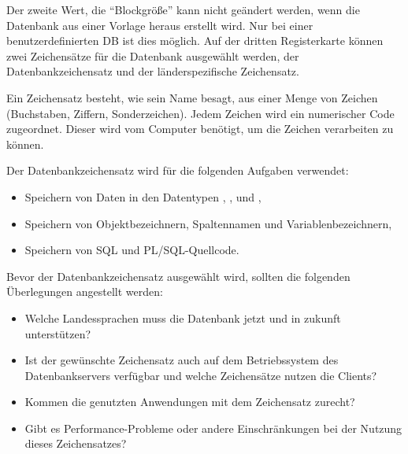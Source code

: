           Der zweite Wert, die \enquote{Blockgröße} kann nicht geändert
          werden, wenn die Datenbank aus einer Vorlage heraus erstellt wird. Nur
          bei einer benutzerdefinierten DB ist dies möglich.
          Auf der dritten Registerkarte können zwei Zeichensätze für die
          Datenbank ausgewählt werden, der Datenbankzeichensatz und der
          länderspezifische Zeichensatz.
          \begin{merke}
            Ein Zeichensatz besteht, wie sein Name besagt, aus einer Menge von Zeichen (Buchstaben,               Ziffern, Sonderzeichen). Jedem Zeichen wird ein numerischer Code zugeordnet. Dieser wird vom Computer benötigt, um die Zeichen verarbeiten zu können.
          \end{merke}
          Der Datenbankzeichensatz wird für die folgenden Aufgaben verwendet:
          \begin{itemize}
            \item Speichern von Daten in den Datentypen , ,  und ,
            \item Speichern von Objektbezeichnern, Spaltennamen und Variablen\-be\-zeich\-nern,
            \item Speichern von SQL und PL/SQL-Quellcode.
          \end{itemize}
          Bevor der Datenbankzeichensatz ausgewählt wird, sollten die folgenden Überlegungen angestellt werden:
          \begin{itemize}
            \item Welche Landessprachen muss die Datenbank jetzt und in zukunft unterstützen?
            \item Ist der gewünschte Zeichensatz auch auf dem Betriebssystem des Datenbankservers verfügbar und welche Zeichensätze nutzen die Clients?
            \item Kommen die genutzten Anwendungen mit dem Zeichensatz zurecht?
            \item Gibt es Performance-Probleme oder andere Einschränkungen bei der Nutzung dieses Zeichensatzes?
          \end{itemize}

